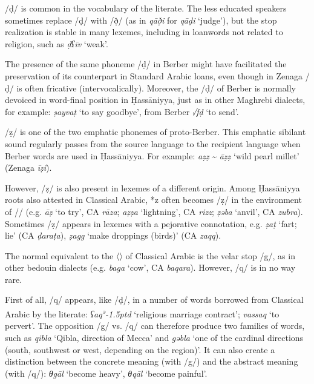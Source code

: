 \documentclass[output=paper]{langsci/langscibook}
\begin{document}
/ḍ/ is common in the vocabulary of the literate. The less educated speakers sometimes replace /ḍ/ with /ð̣/ (as in \textit{qāð̣i} for \textit{qāḍi} ‘judge’), but the stop realization is stable in many lexemes, including in loanwords not related to religion, such as \textit{ḍʕīv} ‘weak’.

The presence of the same phoneme /ḍ/ in Berber might have facilitated the preservation of its counterpart in Standard Arabic loans, even though in Zenaga /ḍ/ is often fricative (intervocalically). Moreover, the /ḍ/ of Berber is normally devoiced in word-final position in Ḥassāniyya, just as in other Maghrebi dialects, for example: \textit{ṣayvaṭ} ‘to say goodbye’, from Berber \textit{√fḍ} ‘to send’.

/ẓ/ is one of the two emphatic phonemes of proto-Berber. This emphatic sibilant sound regularly passes from the source language to the recipient language when Berber words are used in Ḥassāniyya. For example: \textit{aẓẓ} \~{} \textit{āẓẓ} ‘wild pearl millet’ (Zenaga \textit{īẓi}).

However, /ẓ/ is also present in lexemes of a different origin. Among Ḥassāniyya roots also attested in Classical Arabic, *z often becomes /ẓ/ in the environment of /{\R}/ (e.g. \textit{{\R}āẓ} ‘to try’, CA \textit{rāza}; \textit{{\R}aẓẓa} ‘lightning’, CA \textit{rizz}; \textit{ẓəb{\R}a} ‘anvil’, CA \textit{zubra}). Sometimes /ẓ/ appears in lexemes with a pejorative connotation, e.g. \textit{ẓ{\R}aṭ} ‘fart; lie’ (CA \textit{ḍaraṭa}), \textit{ẓagg} ‘make droppings (birds)’ (CA \textit{zaqq}).

The normal equivalent to the 〈{}〉 of Classical Arabic is the velar stop /g/, as in other bedouin dialects (e.g. \textit{bag{\R}a} ‘cow’, CA \textit{baqara}). However, /q/ is in no way rare.

First of all, /q/ appears, like /ḍ/, in a number of words borrowed from Classical Arabic by the literate: \textit{ʕaq\kern 0.5pt\textsuperscript{ə}\kern -1.5ptd} ‘religious marriage contract’; \textit{vassaq} ‘to pervert’. The opposition /g/ vs. /q/ can therefore produce two families of words, such as \textit{qibla} ‘Qibla, direction of Mecca’ and \textit{gəbla} ‘one of the cardinal directions (south, southwest or west, depending on the region)’. It can also create a distinction between the concrete meaning (with /g/) and the abstract meaning (with /q/): \textit{θgāl} ‘become heavy’, \textit{θqāl} ‘become painful’.
\end{document}
